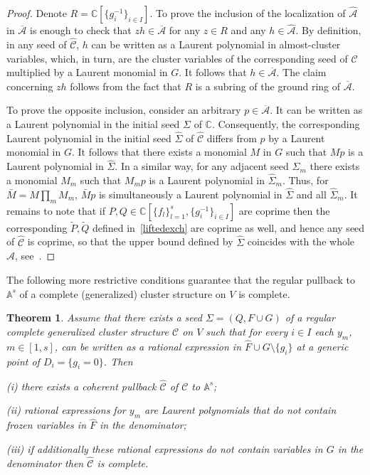 \documentclass{amsart}
\newtheorem{theorem}{Theorem}
\theoremstyle{definition}
\theoremstyle{remark}
\numberwithin{equation}{section}
\numberwithin{theorem}{section}
\def\A{{\mathcal A}}
\def\AA{{\mathbb A}}
\def\C{{\mathbb C}}
\def\CC{{\mathcal C}}
\def\UU{\overline{\A}}
\begin{document}
\begin{proof}
Denote $R=\C[\{g_i^{-1}\}_{i\in I}]$. 
To prove the inclusion of the localization of $\widehat{\A}$ in $\UU$ is enough to check that $zh\in\UU$ for any 
$z\in R$ and any $h\in \widehat{\A}$. By definition, in any seed of $\widehat\CC$, $h$ can be written as a Laurent polynomial in almost-cluster variables, which, in turn, are the cluster variables of the corresponding seed of 
$\CC$ multiplied by a Laurent monomial in $G$. It follows that $h\in\UU$. The claim concerning $zh$ follows from the fact that $R$ is a subring of the ground ring of $\UU$.

To prove the opposite inclusion, consider an arbitrary $p\in\UU$. It can be written as a Laurent polynomial in the initial seed $\Sigma$ of $\C$. Consequently, the corresponding Laurent polynomial in the initial seed $\widehat\Sigma$ of 
$\widehat\CC$ differs from $p$ by a Laurent monomial in $G$. It follows that there exists a monomial
$M$ in $G$ such that $Mp$ is a Laurent polynomial in  $\widehat\Sigma$. In a similar way, for any adjacent
seed $\Sigma_m$ there exists a monomial $M_m$ such that $M_mp$ is a Laurent polynomial in  $\widehat\Sigma_m$. Thus, for
$\bar M=M\prod_mM_m$, $\bar Mp$ is simultaneously a Laurent polynomial in $\widehat\Sigma$ and all $\widehat\Sigma_m$. It remains to note that if $P,Q\in\C[\{f_l\}_{l=1}^s, \{g_i^{-1}\}_{i\in I}]$ are coprime then the corresponding 
$\tilde P,\tilde Q$ defined in~\eqref{liftedexch} are coprime as well, and hence any seed of $\widehat\CC$ is coprime, so that the upper bound defined by $\widehat\Sigma$ coincides with the whole $\widehat\A$, see~\cite[Theorem~1.5]{BFZ}.
\end{proof}

The following more restrictive conditions guarantee that the regular pullback to $\AA^s$ of a complete (generalized) cluster structure on $V$ is complete.

\begin{theorem}\label{pullbackcomp}
Assume that there exists a seed $\Sigma=(Q,F\cup G)$ of a regular complete generalized cluster structure $\CC$ on $V$ such that for every $i\in I$ each $y_m$, $m\in[1,s]$, can be written as a rational expression in $\widehat F\cup G\setminus\{g_i\}$ at a generic point of $D_i=\{g_i=0\}$. Then

{\rm (i)} there exists a coherent pullback $\widehat\CC$ of $\CC$ to $\AA^s$;

{\rm (ii)} rational expressions for $y_m$ are Laurent polynomials that do not contain frozen variables in $\widehat F$ in the denominator;

{\rm (iii)} if additionally these rational expressions do not contain variables in $G$ in the denominator then
$\widehat\CC$ is complete.
\end{theorem}
\end{document}
